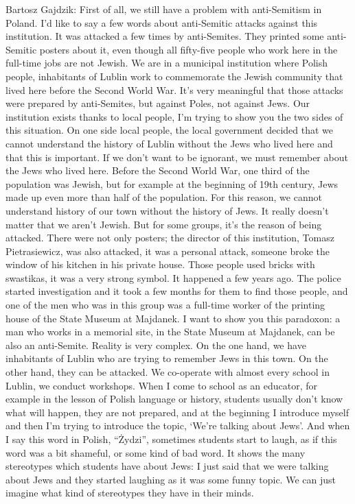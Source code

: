 Bartosz Gajdzik: First of all, we still have a problem with anti-Semitism in Poland. I’d like to say a few words about anti-Semitic attacks against this institution. It was attacked a few times by anti-Semites. They printed some anti-Semitic posters about it, even though all fifty-five people who work here in the full-time jobs are not Jewish. We are in a municipal institution where Polish people, inhabitants of Lublin work to commemorate the Jewish community that lived here before the Second World War. It’s very meaningful that those attacks were prepared by anti-Semites, but against Poles, not against Jews. Our institution exists thanks to local people, I’m trying to show you the two sides of this situation. On one side local people, the local government decided that we cannot understand the history of Lublin without the Jews who lived here and that this is important. If we don’t want to be ignorant, we must remember about the Jews who lived here. Before the Second World War, one third of the population was Jewish, but for example at the beginning of 19th century, Jews made up even more than half of the population. For this reason, we cannot understand history of our town without the history of Jews. It really doesn’t matter that we aren’t Jewish. But for some groups, it’s the reason of being attacked. There were not only posters; the director of this institution, Tomasz Pietrasiewicz, was also attacked, it was a personal attack, someone broke the window of his kitchen in his private house. Those people used bricks with swastikas, it was a very strong symbol. It happened a few years ago. The police started investigation and it took a few months for them to find those people, and one of the men who was in this group was a full-time worker of the printing house of the State Museum at Majdanek. I want to show you this paradoxon: a man who works in a memorial site, in the State Museum at Majdanek, can be also an anti-Semite. Reality is very complex. On the one hand, we have inhabitants of Lublin who are trying to remember Jews in this town. On the other hand, they can be attacked.  
We co-operate with almost every school in Lublin, we conduct workshops. When I come to school as an educator, for example in the lesson of Polish language or history, students usually don’t know what will happen, they are not prepared, and at the beginning I introduce myself and then I’m trying to introduce the topic, ‘We’re talking about Jews’. And when I say this word in Polish, “Żydzi”, sometimes students start to laugh, as if this word was a bit shameful, or some kind of bad word. It shows the many stereotypes which students have about Jews: I just said that we were talking about Jews and they started laughing as it was some funny topic. We can just imagine what kind of stereotypes they have in their minds. 

